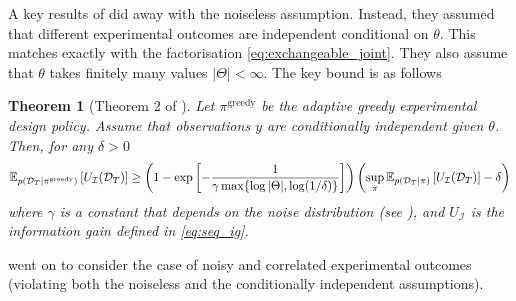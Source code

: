 \documentclass[a4paper, 10pt]{report}
\theoremstyle{plain}
\newtheorem{theorem}{Theorem}
\begin{document}
	A key results of \citet{chen2015sequential} did away with the noiseless assumption.
	Instead, they assumed that different experimental outcomes are independent conditional on $\theta$. This matches exactly with the factorisation \eqref{eq:exchangeable_joint}. They also assume that $\theta$ takes finitely many values $|\Theta|<\infty$. The key bound is as follows
	\begin{theorem}[Theorem 2 of \citet{chen2015sequential}]
		Let $\pi^\text{greedy}$ be the adaptive greedy experimental design policy. Assume that observations $y$ are conditionally independent given $\theta$.
		Then, for any $\delta > 0$
		\begin{equation}
		\begin{split}
		\mathbb{E}_{p(\mathcal{D}_T|\pi^\text{greedy})}\left[ U_\mathcal{I}(\mathcal{D}_T) \right]
		\ge \left(1 - \exp\left[-\frac{1}{\gamma \max \{\log |\Theta|, \log (1/\delta)\}} \right] \right)\left(\sup_\pi \mathbb{E}_{p(\mathcal{D}_T|\pi)}\left[ U_\mathcal{I}(\mathcal{D}_T) \right] - \delta \right)
		\end{split}
		\end{equation}
		where $\gamma$ is a constant that depends on the noise distribution (see \citet{chen2015sequential}), and $U_\mathcal{I}$ is the information gain defined in \eqref{eq:seq_ig}.
	\end{theorem}
	\citet{chen2017near} went on to consider the case of noisy and correlated experimental outcomes (violating both the noiseless and the conditionally independent assumptions). %
	
\end{document}
